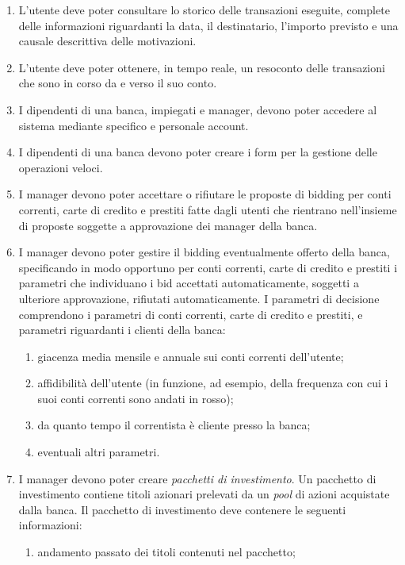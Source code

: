 \begin{enumerate}
\begin{enumerate}
\begin{enumerate}
			\end{enumerate} 
	\end{enumerate}
	\item L'utente deve poter consultare lo storico delle transazioni eseguite, complete delle informazioni riguardanti la data, il destinatario, l'importo previsto e una causale descrittiva delle motivazioni.
	\item L'utente deve poter ottenere, in tempo reale, un resoconto delle transazioni che sono in corso da e verso il suo conto.
	\item I dipendenti di una banca, impiegati e manager, devono poter accedere al sistema mediante specifico e personale account.
	\item I dipendenti di una banca devono poter creare i form per la gestione delle operazioni veloci.
	\item I manager devono poter accettare o rifiutare le proposte di bidding per conti correnti, carte di credito e prestiti fatte dagli utenti che rientrano nell'insieme di proposte soggette a approvazione dei manager della banca.
	\item I manager devono poter gestire il bidding eventualmente offerto della banca, specificando in modo opportuno per conti correnti, carte di credito e prestiti i parametri che individuano i bid accettati automaticamente, soggetti a ulteriore approvazione, rifiutati automaticamente.
	I parametri di decisione comprendono i parametri di conti correnti, carte di credito e prestiti, e parametri riguardanti i clienti della banca:
		\begin{enumerate}
			\item giacenza media mensile e annuale sui conti correnti dell'utente;
			\item affidibilit\`a dell'utente (in funzione, ad esempio, della frequenza con cui i suoi conti correnti sono andati in rosso);
			\item da quanto tempo il correntista \`e cliente presso la banca;
			\item eventuali altri parametri.
		\end{enumerate}
	\item I manager devono poter creare \emph{pacchetti di investimento}.
		Un pacchetto di investimento contiene titoli azionari prelevati da un \emph{pool} di azioni acquistate dalla banca.
		Il pacchetto di investimento deve contenere le seguenti informazioni:
		\begin{enumerate}
			\item andamento passato dei titoli contenuti nel pacchetto;

\end{enumerate}
\end{enumerate}
